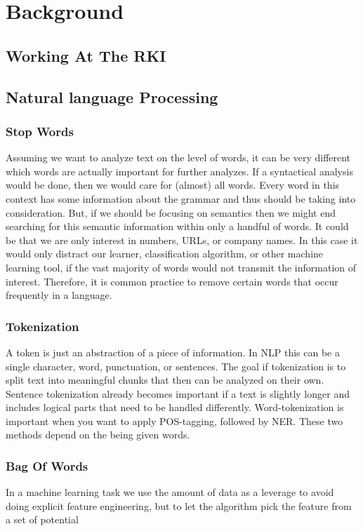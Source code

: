 \chapter{Background}

\section{Working At The RKI}

\section{Natural language Processing}


\subsection{Stop Words}
Assuming we want to analyze text on the level of words, it can be very different
which words are actually important for further analyzes. If a syntactical analysis
would be done, then we would care for (almost) all words. Every word in this
context has some information about the grammar and thus should be taking
into consideration. But, if we should be focusing on semantics then we might
end searching for this semantic information within only a handful of words. It
could be that we are only interest in numbers, URLs, or company names. In this
case it would only distract our learner, classification algorithm, or other machine
learning tool, if the vast majority of words would not transmit the information
of interest. Therefore, it is common practice to remove certain words that occur
frequently in a language.


\subsection{Tokenization}
A token is just an abstraction of a piece of information. In NLP this can be a
single character, word, punctuation, or sentences. The goal if tokenization is
to split text into meaningful chunks that then can be analyzed on their own.
Sentence tokenization already becomes important if a text is slightly longer and
includes logical parts that need to be handled differently. Word-tokenization is
important when you want to apply POS-tagging, followed by NER. These two
methods depend on the being given words.


\subsection{Bag Of Words}
In a machine learning task we use the amount of data as a leverage to avoid
doing explicit feature engineering, but to let the algorithm pick the feature from
a set of potential

